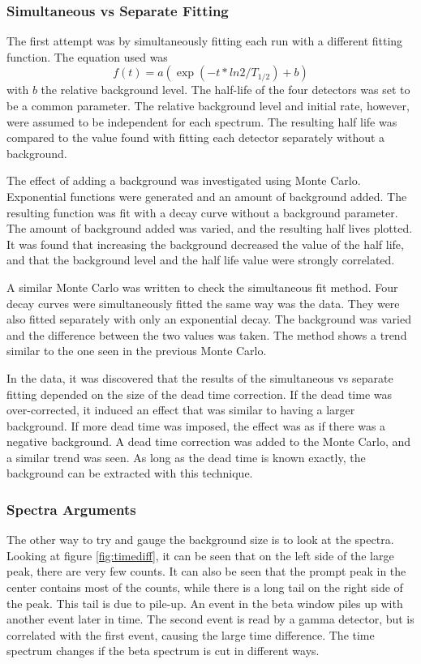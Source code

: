 \documentclass[MaxHughesThesis.tex]{subfiles}
\begin{document}
\subsubsection{Simultaneous vs Separate Fitting}
The first attempt was by simultaneously fitting each run with a different fitting function.
The equation used was 
%
\begin{equation}
	f(t) = a(\exp(-t*ln2/T_{1/2}) + b)
	\label{eq:fit-bg}
\end{equation}
%
with $b$ the relative background level.
The half-life of the four detectors was set to be a common parameter. 
The relative background level and initial rate, however, were assumed to be independent for each spectrum.
The resulting half life was compared to the value found with fitting each detector separately without a background.

The effect of adding a background was investigated using Monte Carlo.
Exponential functions were generated and an amount of background added.
The resulting function was fit with a decay curve without a background parameter.
The amount of background added was varied, and the resulting half lives plotted.
It was found that increasing the background decreased the value of the half life, and that the background level and the half life value were strongly correlated.

A similar Monte Carlo was written to check the simultaneous fit method.
Four decay curves were simultaneously fitted the same way was the data.
They were also fitted separately with only an exponential decay.
The background was varied and the difference between the two values was taken.
The method shows a trend similar to the one seen in the previous Monte Carlo.

In the data, it was discovered that the results of the simultaneous vs separate fitting depended on the size of the dead time correction.
If the dead time was over-corrected, it induced an effect that was similar to having a larger background.
If more dead time was imposed, the effect was as if there was a negative background.
A dead time correction was added to the Monte Carlo, and a similar trend was seen.
As long as the dead time is known exactly, the background can be extracted with this technique. 

\subsubsection{Spectra Arguments}
The other way to try and gauge the background size is to look at the spectra.
Looking at figure \ref{fig:timediff}, it can be seen that on the left side of the large peak, there are very few counts.
It can also be seen that the prompt peak in the center contains most of the counts, while there is a long tail on the right side of the peak.
This tail is due to pile-up. 
An event in the beta window piles up with another event later in time. 
The second event is read by a gamma detector, but is correlated with the first event, causing the large time difference.
The time spectrum changes if the beta spectrum is cut in different ways.
\end{document}
